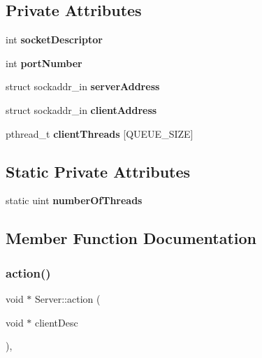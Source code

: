 \subsection*{Private Attributes}
\begin{DoxyCompactItemize}
\item 
\mbox{\label{classServer_a5e52b598760882795a7ea0aada7cb9b7}} 
int {\bfseries socket\+Descriptor}
\item 
\mbox{\label{classServer_a72256f23fe1dbb301a6a19e440f5d089}} 
int {\bfseries port\+Number}
\item 
\mbox{\label{classServer_a0a84291035718de02da7e2c4e661f2a1}} 
struct sockaddr\+\_\+in {\bfseries server\+Address}
\item 
\mbox{\label{classServer_acdd70cf1b3b5724edd46307b017d8123}} 
struct sockaddr\+\_\+in {\bfseries client\+Address}
\item 
\mbox{\label{classServer_a2659f052c537f44a27d2aef4ad079957}} 
pthread\+\_\+t {\bfseries client\+Threads} \mbox{[}Q\+U\+E\+U\+E\+\_\+\+S\+I\+ZE\mbox{]}
\end{DoxyCompactItemize}
\subsection*{Static Private Attributes}
\begin{DoxyCompactItemize}
\item 
\mbox{\label{classServer_ab11a1028476d4235bf3a2d8f468d2b81}} 
static uint {\bfseries number\+Of\+Threads}
\end{DoxyCompactItemize}


\subsection{Member Function Documentation}
\mbox{\label{classServer_a75b8fdcfd5e0438efe7bb79b317caa16}} 
\subsubsection{\texorpdfstring{action()}{action()}}
{\footnotesize\ttfamily void $\ast$ Server\+::action (\begin{DoxyParamCaption}\item[{void $\ast$}]{client\+Desc }\end{DoxyParamCaption})\hspace{0.3cm}{\ttfamily [static]}, {\ttfamily [private]}}



